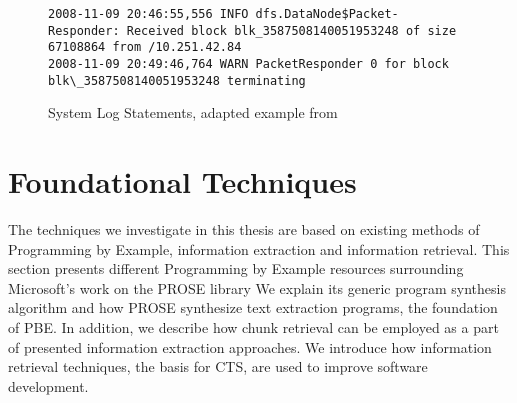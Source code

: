\documentclass[\myrootdir/main.tex]{subfiles}
\begin{document}
\begin{figure}[]
  \centering
  \begin{lstlisting}[breaklines=true]
2008-11-09 20:46:55,556 INFO dfs.DataNode$Packet- Responder: Received block blk_3587508140051953248 of size 67108864 from /10.251.42.84
2008-11-09 20:49:46,764 WARN PacketResponder 0 for block blk\_3587508140051953248 terminating
  \end{lstlisting}  
  \caption{System Log Statements, adapted example from~\cite{he2017towards}}
  \label{lst:system-log}
\end{figure}

\section{Foundational Techniques}
The techniques we investigate in this thesis are based on existing methods of Programming by Example, information extraction and information retrieval.
This section presents different Programming by Example resources surrounding Microsoft's work on the PROSE library
We explain its generic program synthesis algorithm and how PROSE synthesize text extraction programs, the foundation of PBE\@.
In addition, we describe how chunk retrieval can be employed as a part of presented information extraction approaches.
We introduce how information retrieval techniques, the basis for CTS, are used to improve software development.

\end{document}
